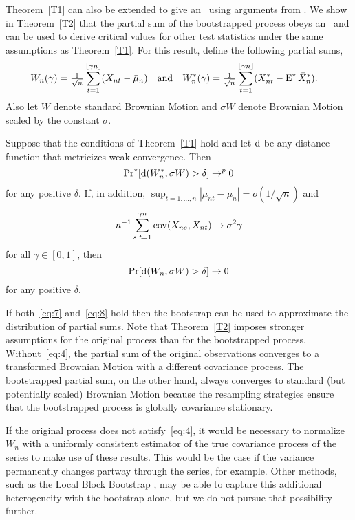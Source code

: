 \documentclass[11pt]{article}
\begin{document}
Theorem~\ref{T1} can also be extended to give an \fclt\
using arguments from \citet{JoD:00b}. We show in
Theorem~\ref{T2} that the partial sum
of the bootstrapped process obeys an \fclt\ and can be used to derive
critical values for other test statistics under the same assumptions
as Theorem~\ref{T1}. For this result, define the
following partial sums,
\begin{align*}
W_n(\gamma) &=
\tfrac{1}{\sqrt{n}} \sum_{t=1}^{\lfloor \gamma n \rfloor}
(X_{nt} - \bar\mu_n) &&\text{and}&
W_n^{*}(\gamma) &= \tfrac{1}{\sqrt{n}}
\sum_{t=1}^{\lfloor \gamma n \rfloor}
(X^*_{nt} - \operatorname{E}^* \bar X_n^*).
\end{align*}
Also let $W$ denote standard Brownian Motion and $\sigma W$ denote
Brownian Motion scaled by the constant $\sigma$.

\begin{thm}\label{T2}
Suppose that the conditions of Theorem~\ref{T1} hold
and let $\operatorname{d}$ be any distance function that metricizes weak
convergence. Then
\begin{equation}\label{eq:7}
\operatorname{Pr}^{*}[\operatorname{d}(W_n^{*}, \sigma W) > \delta] \to^p 0
\end{equation}
for any positive  $\delta$.
If, in addition, $\sup_{t=1,\dots,n}|\mu_{nt} -
\bar \mu_n| = o(1/\sqrt{n})$ and
\begin{equation}\label{eq:4}
n^{-1} \sum_{s,t=1}^{\lfloor \gamma n \rfloor} \operatorname{cov}(X_{ns}, X_{nt}) \to \sigma^2 \gamma
\end{equation}
for all $\gamma \in [0,1]$, then
\begin{equation}\label{eq:8}
\operatorname{Pr}[\operatorname{d}(W_n, \sigma W) > \delta] \to 0
\end{equation}
for any positive $\delta$.
\end{thm}
If both~\eqref{eq:7} and~\eqref{eq:8} hold then the bootstrap can be
used to approximate the distribution of partial sums.
Note that Theorem~\ref{T2} imposes
stronger assumptions for the original process
than for the bootstrapped process. Without~\eqref{eq:4}, the
partial sum of the original observations converges to a transformed
Brownian Motion with a different covariance process. The bootstrapped
partial sum, on the other hand, always converges to standard (but
potentially scaled) Brownian Motion because the resampling strategies
ensure that the bootstrapped process is globally covariance stationary.

If the original process does not satisfy~\eqref{eq:4}, it would be
necessary to normalize $W_n$ with a uniformly
consistent estimator of the true covariance process of the series to
make use of these results. This would be the case if the variance
permanently changes partway through the series, for example.  Other
methods, such as the Local Block Bootstrap \citep{PaP:02,DPP:03}, may
be able to capture this additional heterogeneity with the bootstrap
alone, but we do not pursue that possibility further.
\end{document}
